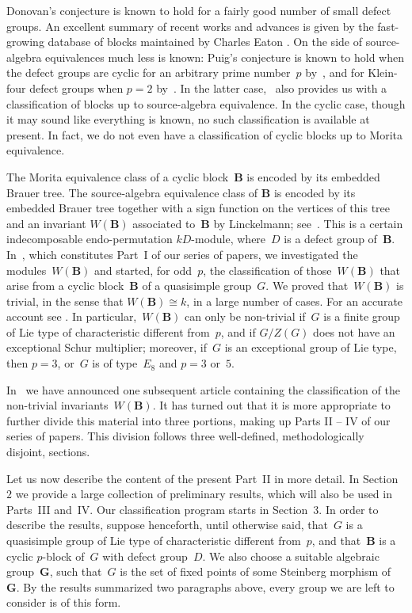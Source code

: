 \documentclass[12pt]{amsart}
\newcommand{\bG}{{\mathbf{G}}}      %
\newcommand{\bB}{{\mathbf{B}}}
\theoremstyle{theorem}
\theoremstyle{definition}
\theoremstyle{remark}
\begin{document}
Donovan's conjecture is known to hold for a fairly good number of small defect 
groups. An excellent summary of recent works and advances is given by 
the fast-growing database of blocks maintained by Charles Eaton \cite{EaWiki}. 
On the side of source-algebra equivalences much less is known: Puig's conjecture 
is known to hold when the defect groups are cyclic for an arbitrary prime 
number~$p$ by~\cite{Li96}, and for Klein-four defect groups when $p = 2$ 
by~\cite{CEKL}. In the latter case,~\cite{CEKL} also provides us with a 
classification of blocks up to source-algebra equivalence. In the cyclic case, 
though it may sound like everything is known, no such classification is 
available at present. In fact, we do not even have a classification of cyclic 
blocks up to Morita equivalence.

The Morita equivalence class of a cyclic block~$\mathbf{B}$ is encoded by its 
embedded Brauer tree. The source-algebra equivalence class of $\mathbf{B}$ is 
encoded by its embedded Brauer tree together with a sign function on the 
vertices of this tree and an invariant $W(\mathbf{B})$ associated to~$\bB$ by 
Linckelmann; see~\cite{Li96}. This is a certain indecomposable endo-permutation 
$kD$-module, 
where~$D$ is a defect group of~$\bB$. In~\cite{HL24}, which constitutes Part~I 
of our series of papers, we investigated the modules~$W( \bB )$ and started, for 
odd~$p$, the classification of those~$W( \bB )$ that arise from a cyclic 
block~$\bB$ of a quasisimple group~$G$. We proved that~$W( \bB )$ is trivial, in 
the sense that $W( \bB ) \cong k$, in a large number of cases. For an accurate 
account see \cite[Section~$6$]{HL24}. In particular,~$W( \bB )$ can only be 
non-trivial if~$G$ is a finite group of Lie type of characteristic different 
from~$p$, and if $G/Z(G)$ does not have an exceptional Schur multiplier;
moreover, if~$G$ is an exceptional group of Lie type, then $p = 3$, or~$G$ is of 
type~$E_8$ and $p = 3$ or~$5$.

In~\cite{HL24} we have announced one subsequent article containing the  
classification of the non-trivial invariants~$W( \bB )$. It has turned out that 
it is more appropriate to further divide this material into three portions, 
making up Parts II -- IV of our series of papers. This division follows three 
well-defined, methodologically disjoint, sections. 

Let us now describe the content of the present Part~II in more detail. In 
Section~$2$ we provide a large collection of preliminary results, which will 
also be used in Parts~III and~IV. Our classification program starts in 
Section~$3$. In order to describe the results, suppose henceforth, until 
otherwise said, that~$G$ is a quasisimple group of Lie type of characteristic
different from~$p$, and that~$\bB$ is a cyclic $p$-block of~$G$ with defect 
group~$D$. We also choose a suitable algebraic group~$\bG$, such that~$G$ is the 
set of fixed points of some Steinberg morphism of~$\bG$. By the results 
summarized two paragraphs above, every group we are left to consider is of this 
form.
\end{document}
